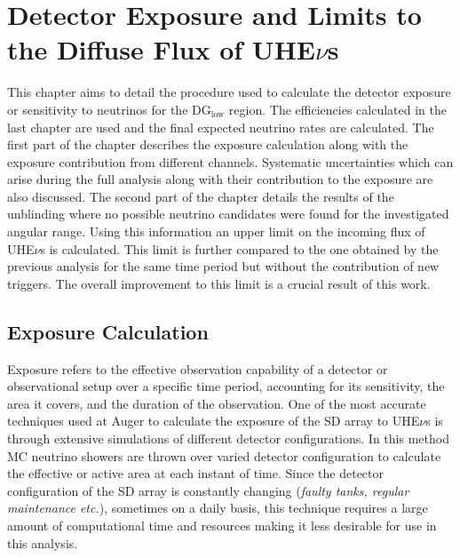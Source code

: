 
\chapter{Detector Exposure and Limits to the Diffuse Flux of UHE\texorpdfstring{$\nu$}{}s}
\label{sec:align}
 
This chapter aims to detail the procedure used to calculate the detector exposure or sensitivity to neutrinos for the DG$\mathrm{_{\text{low}}}$ region. The efficiencies calculated in the last chapter are used and the final expected neutrino rates are calculated. The first part of the chapter describes the exposure calculation along with the exposure contribution from different channels. Systematic uncertainties which can arise during the full analysis along with their contribution to the exposure are also discussed. 
The second part of the chapter details the results of the unblinding where no possible neutrino candidates were found for the investigated angular range. Using this information an upper limit on the incoming flux of UHE$\nu$s is calculated. This limit is further compared to the one obtained by the previous analysis for the same time period but without the contribution of new triggers. The overall improvement to this limit is a crucial result of this work. 


\section{Exposure Calculation}
\label{sec:det_exposure_calc}

Exposure refers to the effective observation capability of a detector or observational setup over a specific time period, accounting for its sensitivity, the area it covers, and the duration of the observation. One of the most accurate techniques used at Auger to calculate the exposure of the SD array to UHE$\nu$s is through extensive simulations of different detector configurations. In this method MC neutrino showers are thrown over varied detector configuration to calculate the effective or active area at each instant of time. Since the detector configuration of the SD array is constantly changing (\textit{faulty tanks, regular maintenance etc.}), sometimes on a daily basis, this technique requires a large amount of computational time and resources making it less desirable for use in this analysis. 

